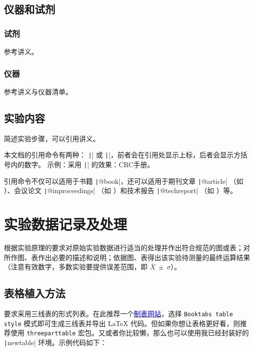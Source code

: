 \documentclass[a4paper,12pt]{article}
\begin{document}
\subsection{仪器和试剂}
\subsubsection{试剂}
参考讲义。

\subsubsection{仪器}
参考讲义与仪器清单。

\subsection{实验内容}
简述实验步骤，可以引用讲义。

本文档的引用命令有两种： \texttt|\supercite{}| 或 \texttt|\cite{}|，前者会在引用处显示上标，后者会显示方括号内的数字。
示例：采用 \texttt|\supercite{haynes2016crc}| 的效果：CRC手册\supercite{haynes2016crc}。

引用命令不仅可以适用于书籍 \texttt|@book|，还可以适用于期刊文章 \texttt|@article| （如 \cite{example_article}）、会议论文 \texttt|@inproceedings| （如 \cite{example_inproceedings}）和技术报告 \texttt|@techreport| （如 \cite{example_techreport}）等。

\vspace{1cm}
\section{实验数据记录及处理}
\label{sec:data}

根据实验原理的要求对原始实验数据进行适当的处理并作出符合规范的图或表；对所作图、表作出必要的描述和说明；依据图、表得出该实验待测量的最终运算结果（注意有效数字，多数实验要提供误差范围，即 $\overline{X}\ \pm\ \sigma$）。

\subsection{表格植入方法}

要求采用三线表的形式列表。在此推荐一个\href{https://www.tablesgenerator.com/}{\textcolor{blue}{制表网站}}，选择 \texttt{Booktabs table style} 模式即可生成三线表并导出 \LaTeX{} 代码。但如果你想让表格更好看，则推荐使用 \texttt{threeparttable} 宏包。又或者你比较懒，那么也可以使用我已经封装好的 \texttt|newtable| 环境。示例代码如下：
\end{document}
